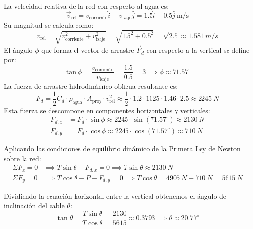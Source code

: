 \documentclass[11pt,a4paper]{article}
\begin{document}
La velocidad relativa de la red con respecto al agua es:
\begin{equation}\label{eq:v_rel_vec}
\vec{v}_{\text{rel}} = v_{\text{corriente}} \hat{i} - v_{\text{izaje}} \hat{j} = 1.5 \hat{i} - 0.5 \hat{j}\;\text{m/s}
\end{equation}
Su magnitud se calcula como:
\begin{equation}\label{eq:v_rel_mag}
v_{\text{rel}} = \sqrt{v_{\text{corriente}}^2 + v_{\text{izaje}}^2} = \sqrt{1.5^2 + 0.5^2} = \sqrt{2.5} \approx \SI{1.581}{m/s}
\end{equation}
El ángulo $\phi$ que forma el vector de arrastre $\vec{F}_d$ con respecto a la vertical se define por:
\begin{equation}\label{eq:angulo_drag}
\tan\phi = \frac{v_{\text{corriente}}}{v_{\text{izaje}}} = \frac{1.5}{0.5} = 3 \implies \phi \approx 71.57^\circ
\end{equation}
La fuerza de arrastre hidrodinámico oblicua resultante es:
\begin{equation}\label{eq:drag_corriente_num}
F_d = \frac{1}{2} C_d \cdot \rho_{\text{agua}} \cdot A_{\text{proy}} \cdot v_{\text{rel}}^2 \approx \frac{1}{2} \cdot 1.2 \cdot 1025 \cdot 1.46 \cdot 2.5 \approx \SI{2245}{N}
\end{equation}
Esta fuerza se descompone en componentes horizontales y verticales:
\begin{align}
F_{d,x} &= F_d \cdot \sin\phi \approx 2245 \cdot \sin(71.57^\circ) \approx \SI{2130}{N} \label{eq:fdx_num} \\
F_{d,y} &= F_d \cdot \cos\phi \approx 2245 \cdot \cos(71.57^\circ) \approx \SI{710}{N} \label{eq:fdy_num}
\end{align}

Aplicando las condiciones de equilibrio dinámico de la Primera Ley de Newton sobre la red:
\begin{align}
\Sigma F_x = 0 &\implies T\sin\theta - F_{d,x} = 0 \implies T\sin\theta \approx \SI{2130}{N} \label{eq:eq_x_corriente} \\
\Sigma F_y = 0 &\implies T\cos\theta - P - F_{d,y} = 0 \implies T\cos\theta = \SI{4905}{N} + \SI{710}{N} = \SI{5615}{N} \label{eq:eq_y_corriente}
\end{align}

Dividiendo la ecuación horizontal entre la vertical obtenemos el ángulo de inclinación del cable $\theta$:
\begin{equation}\label{eq:angulo_cable_num}
\tan\theta = \frac{T\sin\theta}{T\cos\theta} = \frac{2130}{5615} \approx 0.3793 \implies \theta \approx 20.77^\circ
\end{equation}
\end{document}
